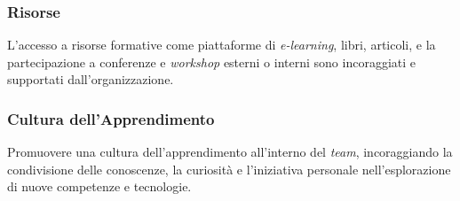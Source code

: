 \subsubsection{Risorse}
L'accesso a risorse formative come piattaforme di \textit{e-learning}, libri,
articoli, e la partecipazione a conferenze e \textit{workshop} esterni o interni
sono incoraggiati e supportati dall'organizzazione.

\subsubsection{Cultura dell'Apprendimento}
Promuovere una cultura dell'apprendimento all'interno del \textit{team}, incoraggiando
la condivisione delle conoscenze, la curiosità e l'iniziativa personale
nell'esplorazione di nuove competenze e tecnologie.
